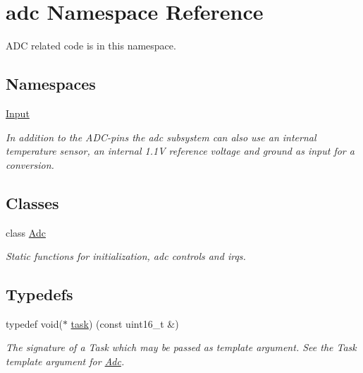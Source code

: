 \hypertarget{namespaceadc}{}\section{adc Namespace Reference}
\label{namespaceadc}


A\+DC related code is in this namespace.  


\subsection*{Namespaces}
\begin{DoxyCompactItemize}
\item 
 \hyperlink{namespaceadc_1_1Input}{Input}
\begin{DoxyCompactList}\small\item\em In addition to the A\+D\+C-\/pins the adc subsystem can also use an internal temperature sensor, an internal 1.\+1V reference voltage and ground as input for a conversion. \end{DoxyCompactList}\end{DoxyCompactItemize}
\subsection*{Classes}
\begin{DoxyCompactItemize}
\item 
class \hyperlink{classadc_1_1Adc}{Adc}
\begin{DoxyCompactList}\small\item\em Static functions for initialization, adc controls and irqs. \end{DoxyCompactList}\end{DoxyCompactItemize}
\subsection*{Typedefs}
\begin{DoxyCompactItemize}
\item 
\hypertarget{namespaceadc_a0e6e6773a0ed848acb0887f1ed3c76ae}{}\label{namespaceadc_a0e6e6773a0ed848acb0887f1ed3c76ae} 
typedef void($\ast$ \hyperlink{namespaceadc_a0e6e6773a0ed848acb0887f1ed3c76ae}{task}) (const uint16\+\_\+t \&)
\begin{DoxyCompactList}\small\item\em The signature of a {\ttfamily Task} which may be passed as template argument. See the {\ttfamily Task} template argument for {\ttfamily \hyperlink{classadc_1_1Adc}{Adc}}. \end{DoxyCompactList}\end{DoxyCompactItemize}
